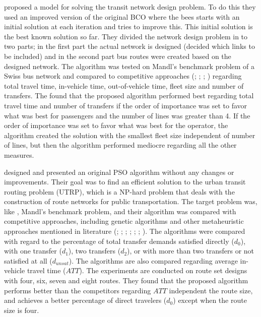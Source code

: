 \citet{nikolic14} proposed a model for solving the transit network design problem. To do this they used an improved version of the original BCO \citep{lucic03} where the bees starts with an initial solution at each iteration and tries to improve this. This initial solution is the best known solution so far. They divided the network design problem in to two parts; in the first part the actual network is designed (decided which links to be included) and in the second part bus routes were created based on the designed network. The algorithm was tested on Mandl's benchmark problem of a Swiss bus network\citep{mandl80} and compared to competitive approaches (\citet{mandl80}; \citet{shih94}; \citet{baaj95}; \citet{bagloee11}) regarding total travel time, in-vehicle time, out-of-vehicle time, fleet size and number of transfers. The found that the proposed algorithm performed best regarding total travel time and number of transfers if the order of importance was set to favor what was best for passengers and the number of lines was greater than 4. If the order of importance was set to favor what was best for the operator, the algorithm created the solution with the smallest fleet size independent of number of lines, but then the algorithm performed mediocre regarding all the other measures. 

\citet{kechagiopoulos14} designed and presented an original PSO algorithm without any changes or improvements. Their goal was to find an efficient solution to the urban transit routing problem (UTRP), which is a NP-hard problem that deals with the construction of route networks for public transportation. The target problem was, like \citet{nikolic14}, Mandl's benchmark problem, and their algorithm was compared with competitive approaches, including genetic algorithms and other metaheuristic approaches mentioned in literature (\citet{baaj91}; \citet{chakroborty02}; \citet{kidwai98}; \citet{fan10}; \citet{fan09-2}; \citet{zhang10}; \citet{chew12}). The algorithms were compared with regard to the percentage of total transfer demands satisfied directly ($d_0$), with one transfer ($d_1$), two transfers ($d_2$), or with more than two transfers or not satisfied at all ($d_{unsat}$). The algorithms are also compared regarding average in-vehicle travel time ($ATT$). The experiments are conducted on route set designs with four, six, seven and eight routes. They found that the proposed algorithm performs better than the competitors regarding $ATT$ independent the route size, and achieves a better percentage of direct travelers ($d_0$) except when the route size is four.  \newline

